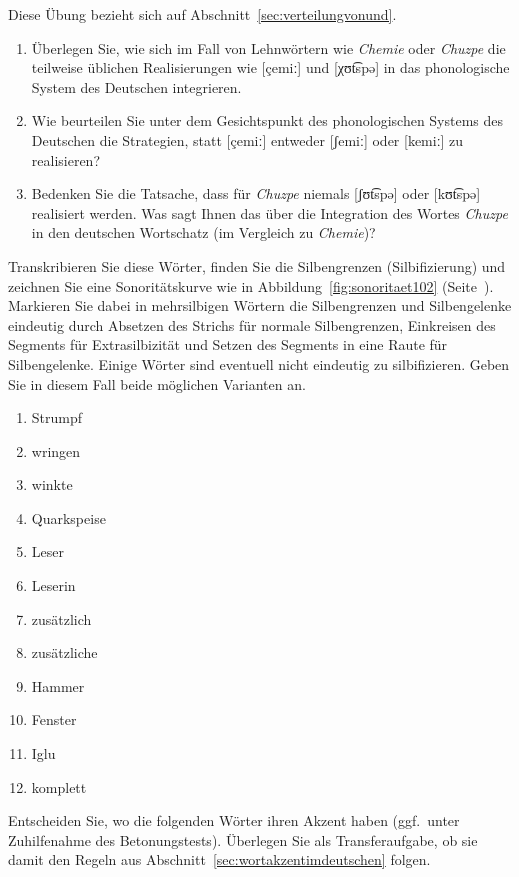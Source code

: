  \label{exc:phonologie03} Diese Übung bezieht sich auf Abschnitt~\ref{sec:verteilungvonund}.

\begin{enumerate}
  \item Überlegen Sie, wie sich im Fall von Lehnwörtern wie \textit{Chemie} oder \textit{Chuzpe} die teilweise üblichen Realisierungen wie [çemiː] und [χʊt͡spə] in das phonologische System des Deutschen integrieren.
  \item Wie beurteilen Sie unter dem Gesichtspunkt des phonologischen Systems des Deutschen die Strategien, statt [çemiː] entweder [ʃemiː] oder [kemiː] zu realisieren?
  \item Bedenken Sie die Tatsache, dass für \textit{Chuzpe} niemals [ʃʊt͡spə] oder [kʊt͡spə] realisiert werden.
    Was sagt Ihnen das über die Integration des Wortes \textit{Chuzpe} in den deutschen Wortschatz (im Vergleich zu \textit{Chemie})?
\end{enumerate}

 \label{exc:phonologie04} Transkribieren Sie diese Wörter, finden Sie die Silbengrenzen (Silbifizierung) und zeichnen Sie eine Sonoritätskurve wie in Abbildung~\ref{fig:sonoritaet102} (Seite~\pageref{fig:sonoritaet102}).
Markieren Sie dabei in mehrsilbigen Wörtern die Silbengrenzen und Silbengelenke eindeutig durch Absetzen des Strichs für normale Silbengrenzen, Einkreisen des Segments für Extrasilbizität und Setzen des Segments in eine Raute für Silbengelenke.
Einige Wörter sind eventuell nicht eindeutig zu silbifizieren.
Geben Sie in diesem Fall beide möglichen Varianten an.

\begin{enumerate}
  \item Strumpf
  \item wringen
  \item winkte
  \item Quarkspeise
  \item Leser
  \item Leserin
  \item zusätzlich
  \item zusätzliche
  \item Hammer
  \item Fenster
  \item Iglu
  \item komplett
\end{enumerate}

 \label{exc:phonologie05} Entscheiden Sie, wo die folgenden Wörter ihren Akzent haben (ggf.\ unter Zuhilfenahme des Betonungstests).
Überlegen Sie als Transferaufgabe, ob sie damit den Regeln aus Abschnitt~\ref{sec:wortakzentimdeutschen} folgen.

